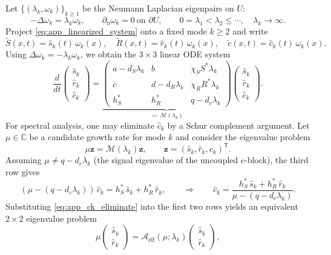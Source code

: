 \documentclass[pdflatex,sn-mathphys-ay]{sn-jnl}
\theoremstyle{thmstyleone}
\theoremstyle{definition}
\theoremstyle{remark}
\begin{document}
Let $\{(\lambda_k,\omega_k)\}_{k\ge1}$ be the Neumann Laplacian eigenpairs on $U$:
\[
-\Delta \omega_k=\lambda_k\omega_k,\qquad \partial_{\mathrm n}\omega_k=0\ \text{on }\partial U,\qquad
0=\lambda_1<\lambda_2\le\cdots,\quad \lambda_k\to\infty.
\]
Project \eqref{eq:app_linearized_system} onto a fixed mode $k\ge2$ and write
\[
\tilde S(x,t)=\hat s_k(t)\,\omega_k(x),\quad
\tilde R(x,t)=\hat r_k(t)\,\omega_k(x),\quad
\tilde c(x,t)=\hat c_k(t)\,\omega_k(x).
\]
Using $\Delta \omega_k=-\lambda_k\omega_k$, we obtain the $3\times3$ linear ODE system
\begin{equation}
\label{eq:app_mode_3by3}
\frac{d}{dt}
\begin{pmatrix}\hat s_k\\[4pt]
\hat r_k\\[4pt]
\hat c_k\end{pmatrix}
=
\underbrace{\begin{pmatrix}
a-d_S\lambda_k & b & \chi_S S^*\lambda_k\\[4pt]
c & d-d_R\lambda_k & \chi_R R^*\lambda_k\\[4pt]
h_S^* & h_R^* & q-d_c\lambda_k
\end{pmatrix}}_{\eqqcolon\,\mathcal{M}(\lambda_k)}
\begin{pmatrix}\hat s_k\\[4pt]
\hat r_k\\[4pt]
\hat c_k\end{pmatrix}.
\end{equation}
For spectral analysis, one may eliminate $\hat c_k$ by a Schur complement argument.
Let $\mu\in\mathbb{C}$ be a candidate growth rate for mode $k$ and consider the eigenvalue problem
\[
\mu \mathbf{z}=\mathcal{M}(\lambda_k)\mathbf{z},\qquad \mathbf{z}=(\hat s_k,\hat r_k,\hat c_k)^{\mathsf T}.
\]
Assuming $\mu\neq q-d_c\lambda_k$ (the signal eigenvalue of the uncoupled $c$-block), the third row gives
\begin{equation}
\label{eq:app_ck_eliminate}
(\mu-(q-d_c\lambda_k))\,\hat c_k = h_S^*\,\hat s_k + h_R^*\,\hat r_k,
\qquad\Longrightarrow\qquad
\hat c_k = \frac{h_S^*\,\hat s_k + h_R^*\,\hat r_k}{\mu-(q-d_c\lambda_k)}.
\end{equation}
Substituting \eqref{eq:app_ck_eliminate} into the first two rows yields an equivalent $2\times2$ eigenvalue problem
\begin{equation}
\label{eq:app_schur_effective_2by2}
\mu
\begin{pmatrix}\hat s_k\\ \hat r_k\end{pmatrix}
=
\mathcal{A}_{\mathrm{eff}}(\mu;\lambda_k)
\begin{pmatrix}\hat s_k\\ \hat r_k\end{pmatrix},
\end{equation}
\end{document}
